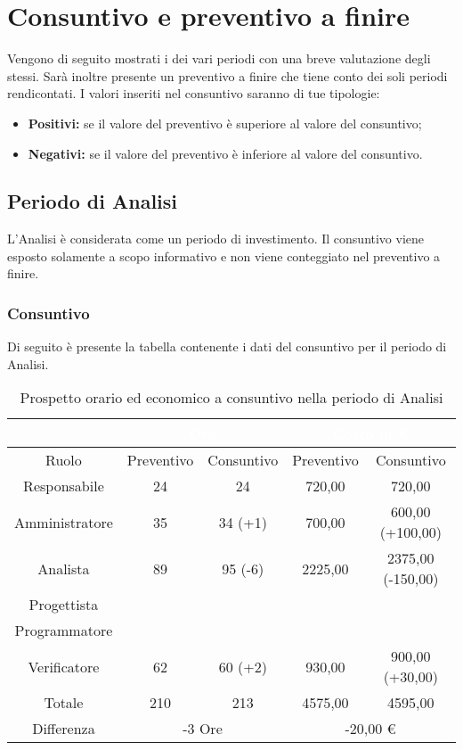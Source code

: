 \section{Consuntivo e preventivo a finire}
\label{consuntivo_preventivo_a_finire}
Vengono di seguito mostrati i  dei vari periodi con una breve valutazione degli stessi. Sarà inoltre presente un preventivo a finire che tiene conto dei soli periodi rendicontati. I valori inseriti nel consuntivo saranno di tue tipologie:
\begin {itemize}
	\item \textbf{Positivi:} se il valore del preventivo è superiore al valore del consuntivo;
	\item \textbf{Negativi:} se il valore del preventivo è inferiore al valore del consuntivo.
\end{itemize}
\subsection{Periodo di Analisi}
L'Analisi è considerata come un periodo di investimento. Il consuntivo viene esposto solamente a scopo informativo e non viene conteggiato nel preventivo a finire.
\subsubsection{Consuntivo}
Di seguito è presente la tabella contenente i dati del consuntivo per il periodo di Analisi.
\begin{table}[H]
	\centering
	\begin{tabular}{|c|c|c|c|c|}
	\rowcolor{darkblue} 
	 	 			&	\multicolumn{2}{c|}{\textcolor{white}{Ore}} 		& 	\multicolumn{2}{c|}{\textcolor{white}{Costo in €}}  \\ \hline
			Ruolo		&	Preventivo	&	Consuntivo	&	Preventivo	&	Consuntivo 	\\ \hline
		Responsabile		&	24		&	24		&	720,00	&	720,00  	\\ \hline
		Amministratore	&	35		&	34 (+1)	&	700,00	&	600,00 (+100,00)  \\ \hline
		Analista		&	89		&	95 (-6)	&	2225,00	&	2375,00 (-150,00)  \\ \hline
		Progettista		& 			&	 		& 			&  			\\ \hline
		Programmatore	& 			& 			& 			&  			\\ \hline
		Verificatore		&	62		&	60 (+2)	&	930,00	&	900,00 (+30,00) 	\\ \hline
		Totale			&	210		&	213		&	4575,00	&	4595,00  	\\ \hline
		Differenza		& 	\multicolumn{2}{c|}{-3 Ore} 	& 	\multicolumn{2}{c|}{-20,00 €} 	\\ \hline
	\end{tabular}
	\caption{Prospetto orario ed economico a consuntivo nella periodo di Analisi}
\end{table}
